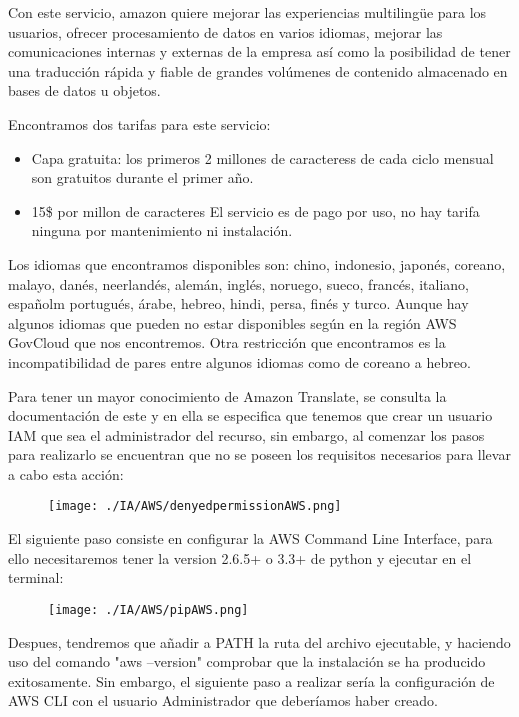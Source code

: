 \documentclass[runningheads]{llncs}
\begin{document}
Con este servicio, amazon quiere mejorar las experiencias multilingüe para los usuarios, ofrecer procesamiento de datos en varios idiomas, mejorar las comunicaciones internas y externas de la empresa así como la posibilidad de tener una traducción rápida y fiable de grandes volúmenes de contenido almacenado en bases de datos u objetos.

Encontramos dos tarifas para este servicio:
\begin{itemize}
    \item Capa gratuita: los primeros 2 millones de caracteress de cada ciclo mensual son gratuitos durante el primer año.
    \item 15\$ por millon de caracteres
El servicio es de pago por uso, no hay tarifa ninguna por mantenimiento ni instalación.

\end{itemize} 
Los idiomas que encontramos disponibles son: chino, indonesio, japonés, coreano, malayo, danés, neerlandés, alemán, inglés, noruego, sueco, francés, italiano, españolm portugués, árabe, hebreo, hindi, persa, finés y turco. Aunque hay algunos idiomas que pueden no estar disponibles según en la región AWS GovCloud que nos encontremos. Otra restricción que encontramos es la incompatibilidad de pares entre algunos idiomas como de coreano a hebreo.


Para tener un mayor conocimiento de Amazon Translate, se consulta la documentación de este y en ella se especifica que tenemos que crear un usuario IAM que sea el administrador del recurso, sin embargo, al comenzar los pasos para realizarlo se encuentran que no se poseen los requisitos necesarios para llevar a cabo esta acción:

\begin{figure}[H]
\centering
\texttt{[image: ./IA/AWS/denyedpermissionAWS.png]}
\end{figure}

El siguiente paso consiste en configurar la AWS Command Line Interface, para  ello necesitaremos tener la version 2.6.5+ o 3.3+ de python y ejecutar en el terminal:

\begin{figure}[H]
\centering
\texttt{[image: ./IA/AWS/pipAWS.png]}
\end{figure}

Despues, tendremos que añadir a PATH la ruta del archivo ejecutable, y haciendo uso del comando "aws --version" comprobar que la instalación se ha producido exitosamente. Sin embargo, el siguiente paso a realizar sería la configuración de AWS CLI con el usuario Administrador que deberíamos haber creado.
\end{document}
